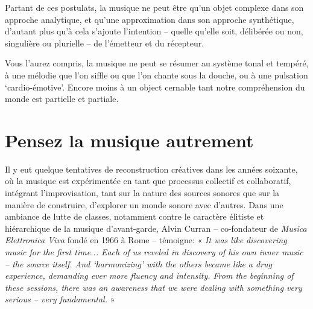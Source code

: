 \documentclass{article}
\begin{document}
\bigskip

Partant de ces postulats, la musique ne peut être qu'un objet complexe dans son approche analytique, et qu'une approximation dans son approche synthétique, d'autant plus qu'à cela s'ajoute l'intention -- quelle qu'elle soit, délibérée ou non, singulière ou plurielle -- de l'émetteur et du récepteur. 

Vous l'aurez compris, la musique ne peut se résumer au système tonal et tempéré, à une mélodie que l'on siffle ou que l'on chante sous la douche, ou à une pulsation `cardio-émotive'. Encore moins à un object cernable tant notre compréhension du monde est partielle et partiale. 

%  
%
\section{Pensez la musique autrement}

Il y eut quelque tentatives de reconstruction créatives dans les années soixante, où la musique est expérimentée en tant que processus collectif et collaboratif, intégrant l'improvisation, tant sur la nature des sources sonores que sur la manière de construire, d'explorer un monde sonore avec d'autres. Dans une ambiance de lutte de classes, notamment contre le caractère élitiste et hiérarchique de la musique d'avant-garde, Alvin Curran -- co-fondateur de \textit{Musica Elettronica Viva} fondé en 1966 à Rome -- témoigne: « \textit{It was like discovering music for the first time... Each of us reveled in discovery of his own inner music -- the source itself. And `harmonizing' with the others became like a drug experience, demanding ever more fluency and intensity. From the beginning of these sessions, there was an awareness that we were dealing with something very serious – very fundamental.} »
\end{document}
